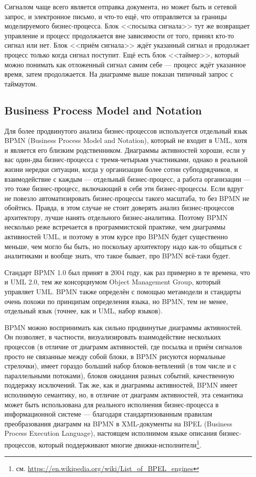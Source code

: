 \documentclass[a5paper]{article}
\begin{document}
Сигналом чаще всего является отправка документа, но может быть и сетевой запрос, и электронное письмо, и что-то ещё, что отправляется за границы моделируемого бизнес-процесса. Блок <<посылка сигнала>> тут же возвращает управление и процесс продолжается вне зависимости от того, принял кто-то сигнал или нет. Блок <<приём сигнала>> ждёт указанный сигнал и продолжает процесс только когда сигнал поступит. Ещё есть блок <<таймер>>, который можно понимать как отложенный сигнал самим себе --- процесс ждёт указанное время, затем продолжается. На диаграмме выше показан типичный запрос с таймаутом.

\subsection{Business Process Model and Notation}

Для более продвинутого анализа бизнес-процессов используется отдельный язык BPMN (Business Process Model and Notation), который не входит в UML, хотя и является его близким родственником. Диаграммы активностей хороши, если у вас один-два бизнес-процесса с тремя-четырьмя участниками, однако в реальной жизни нередки ситуации, когда у организации более сотни субподрядчиков, и взаимодействие с каждым --- отдельный бизнес-процесс, а работа организации --- это тоже бизнес-процесс, включающий в себя эти бизнес-процессы. Если вдруг не повезло автоматизировать бизнес-процессы такого масштаба, то без BPMN не обойтись. Правда, в этом случае не стоит доверять анализ бизнес-процессов архитектору, лучше нанять отдельного бизнес-аналитика. Поэтому BPMN несколько реже встречается в программистской практике, чем диаграммы активностей UML, и поэтому в этом курсе про BPMN будет существенно меньше, чем могло бы быть, но поскольку архитектору надо как-то общаться с аналитиками и вообще знать, что такое бывает, про BPMN всё-таки будет.

Стандарт BPMN 1.0 был принят в 2004 году, как раз примерно в те времена, что и UML 2.0, тем же консорциумом Object Management Group, который управляет UML. BPMN также определён с помощью метамодели и стандарты очень похожи по принципам определения языка, но BPMN, тем не менее, отдельный язык (точнее, как и UML, набор языков).

BPMN можно воспринимать как сильно продвинутые диаграммы активностей. Он позволяет, в частности, визуализировать взаимодействие нескольких процессов (в отличие от диаграмм активностей, где посылка и приём сигналов просто не связанные между собой блоки, в BPMN рисуются нормальные стрелочки), имеет гораздо больший набор блоков-ветвлений (в том числе и с параллельными потоками), блоков ожидания разных событий, качественную поддержку исключений. Так же, как и диаграммы активностей, BPMN имеет исполнимую семантику, но, в отличие от диаграмм активностей, эта семантика может быть использована для реального исполнения бизнес-процесса в информационной системе --- благодаря стандартизованным правилам преобразования диаграмм на BPMN в XML-документы на BPEL (Business Process Execution Language), настоящем исполнимом языке описания бизнес-процессов, который поддерживают многие движки-исполнители\footnote{см. \url{https://en.wikipedia.org/wiki/List_of_BPEL_engines}}.
\end{document}
